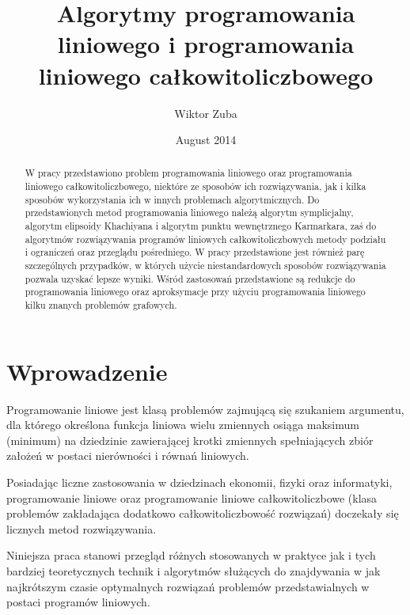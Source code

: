 \documentclass[licencjacka]{pracamgr}
\author{Wiktor Zuba}
\title{Algorytmy programowania liniowego i programowania liniowego całkowitoliczbowego}
\date{August 2014}
\begin{document}
\maketitle

\begin{abstract}
W pracy przedstawiono problem programowania liniowego oraz programowania liniowego całkowitoliczbowego, niektóre ze sposobów ich rozwiązywania,
jak i kilka sposobów wykorzystania ich w innych problemach algorytmicznych.
Do przedstawionych metod programowania liniowego należą algorytm symplicjalny, algorytm elipsoidy Khachiyana i algorytm punktu wewnętrznego Karmarkara,
zaś do algorytmów rozwiązywania programów liniowych całkowitoliczbowych metody podziału i ograniczeń oraz przeglądu pośredniego.
W pracy przedstawione jest również parę szczególnych przypadków, w których użycie niestandardowych sposobów rozwiązywania pozwala uzyskać lepsze wyniki.
Wśród zastosowań przedstawione są redukcje do programowania liniowego oraz aproksymacje przy użyciu programowania liniowego kilku znanych problemów grafowych.
\end{abstract}


\tableofcontents

\chapter*{Wprowadzenie}
Programowanie liniowe jest klasą problemów zajmującą się szukaniem argumentu, dla którego określona funkcja liniowa wielu zmiennych osiąga maksimum (minimum)
na dziedzinie zawierającej krotki zmiennych spełniających zbiór założeń w postaci nierówności i równań liniowych.

Posiadając liczne zastosowania w dziedzinach ekonomii, fizyki oraz informatyki, programowanie liniowe oraz programowanie liniowe całkowitoliczbowe
(klasa problemów zakładająca dodatkowo całkowitoliczbowość rozwiązań) doczekały się licznych metod rozwiązywania.

Niniejsza praca stanowi przegląd różnych stosowanych w praktyce jak i tych bardziej teoretycznych technik i algorytmów służących do znajdywania w jak najkrótszym czasie
optymalnych rozwiązań problemów przedstawialnych w postaci programów liniowych.
\end{document}
